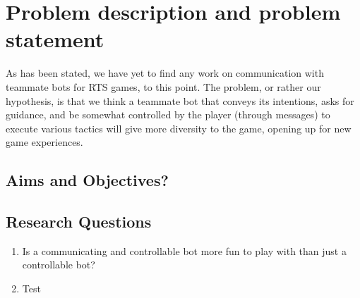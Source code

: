 \chapter{Problem description and problem statement}
As has been stated, we have yet to find any work on communication with teammate bots for RTS games, to this point. The problem, or rather our hypothesis, is that we think a teammate bot that conveys its intentions, asks for guidance, and be somewhat controlled by the player (through messages) to execute various tactics will give more diversity to the game, opening up for new game experiences.

\section{Aims and Objectives?}

\section{Research Questions}
\begin{enumerate}
\item Is a communicating and controllable bot more fun to play with than just a controllable bot?
\item Test
\end{enumerate}